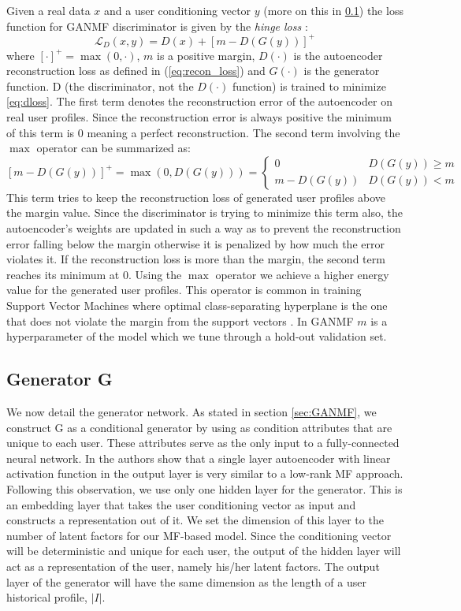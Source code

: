 Given a real data $x$ and a user conditioning vector $y$ (more on this in \ref{sec:GANMF_G}) the loss function for GANMF discriminator is given by the \emph{hinge loss} \cite{zhao2016energy}:
\begin{equation}
    \mathcal{L}_{D}(x, y) = D(x) + [m - D(G(y))]^+
    \label{eq:dloss}
\end{equation}
where $[\cdot]^+ = \max (0, \cdot)$, $m$ is a positive margin, $D(\cdot)$ is the autoencoder reconstruction loss as defined in (\ref{eq:recon_loss}) and $G(\cdot)$ is the generator function.
D (the discriminator, not the $D(\cdot)$ function) is trained to minimize \ref{eq:dloss}. The first term denotes the reconstruction error of the autoencoder on real user profiles. Since the reconstruction error is always positive the minimum of this term is 0 meaning a perfect reconstruction. The second term involving the $\max$ operator can be summarized as:
\[
    [m - D(G(y))]^+ = \max (0, D(G(y))) = 
    \begin{cases}
        0 & D(G(y)) \geq m \\
        m - D(G(y)) & D(G(y)) < m
    \end{cases}
\]
This term tries to keep the reconstruction loss of generated user profiles above the margin value. Since the discriminator is trying to minimize this term also, the autoencoder's weights are updated in such a way as to prevent the reconstruction error falling below the margin otherwise it is penalized by how much the error violates it. If the reconstruction loss is more than the margin, the second term reaches its minimum at 0. Using the $\max$ operator we achieve a higher energy value for the generated user profiles. This operator is common in training Support Vector Machines where optimal class-separating hyperplane is the one that does not violate the margin from the support vectors \cite{cortes1995support}. In GANMF $m$ is a hyperparameter of the model which we tune through a hold-out validation set.

\subsection{Generator G}
\label{sec:GANMF_G}
We now detail the generator network. As stated in section \ref{sec:GANMF}, we construct G as a conditional generator by using as condition attributes that are unique to each user. These attributes serve as the only input to a fully-connected neural network. In \cite{strub2016hybrid} the authors show that a single layer autoencoder with linear activation function in the output layer is very similar to a low-rank MF approach. Following this observation, we use only one hidden layer for the generator. This is an embedding layer that takes the user conditioning vector as input and constructs a representation out of it. We set the dimension of this layer to the number of latent factors for our MF-based model. Since the conditioning vector will be deterministic and unique for each user, the output of the hidden layer will act as a representation of the user, namely his/her latent factors. The output layer of the generator will have the same dimension as the length of a user historical profile, $|I|$. 

